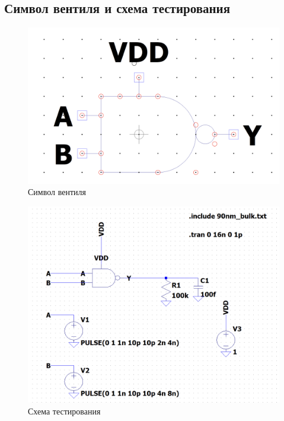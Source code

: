 \documentclass[12pt,onecolumn]{article}
\begin{document}
\subsection{Символ вентиля и схема тестирования}
\begin{figure}[H]
    \centering
    \includegraphics[scale=0.2]{image/symbol.png}
    \caption{Символ вентиля}
\end{figure}
\begin{figure}[H]
    \centering
    \includegraphics[width=\textwidth]{image/test-circuit.png}
    \caption{Схема тестирования}
\end{figure}
\end{document}
